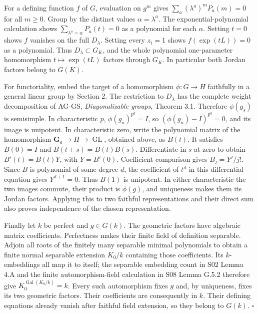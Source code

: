 \documentclass[11pt,a4paper,openany]{report}
\begin{document}
For a defining function \(f\) of \(G\), evaluation on \(g^m\) gives \(\sum_a(\lambda^a)^mP_a(m)=0\) for all \(m\geq0\). Group by the distinct values \(\alpha=\lambda^a\). The exponential-polynomial calculation shows \(\sum_{\lambda^a=\alpha}P_a(t)=0\) as a polynomial for each \(\alpha\). Setting \(t=0\) shows \(f\) vanishes on the full \(D_\lambda\). Setting every \(z_i=1\) shows \(f(\exp(tL))=0\) as a polynomial. Thus \(D_\lambda\subset G_K\), and the whole polynomial one-parameter homomorphism \(t\mapsto\exp(tL)\) factors through \(G_K\). In particular both Jordan factors belong to \(G(K)\).

For functoriality, embed the target of a homomorphism \(\phi:G\to H\) faithfully in a general linear group by Section 2. The restriction to \(D_\lambda\) has the complete weight decomposition of AG-GS, \emph{Diagonalizable groups}, Theorem 3.1. Therefore \(\phi(g_s)\) is semisimple. In characteristic \(p\), \(\phi(g_u)^{p^q}=I\), so \((\phi(g_u)-I)^{p^q}=0\), and its image is unipotent. In characteristic zero, write the polynomial matrix of the homomorphism \(\mathbf G_a\to H\to\operatorname{GL}\), obtained above, as \(B(t)\). It satisfies \(B(0)=I\) and \(B(t+s)=B(t)B(s)\). Differentiate in \(s\) at zero to obtain \(B'(t)=B(t)Y\), with \(Y=B'(0)\). Coefficient comparison gives \(B_j=Y^j/j!\). Since \(B\) is polynomial of some degree \(d\), the coefficient of \(t^d\) in this differential equation gives \(Y^{d+1}=0\). Thus \(B(1)\) is unipotent. In either characteristic the two images commute, their product is \(\phi(g)\), and uniqueness makes them its Jordan factors. Applying this to two faithful representations and their direct sum also proves independence of the chosen representation.

Finally let \(k\) be perfect and \(g\in G(k)\). The geometric factors have algebraic matrix coefficients. Perfectness makes their finite field of definition separable. Adjoin all roots of the finitely many separable minimal polynomials to obtain a finite normal separable extension \(K_0/k\) containing those coefficients. Its \(k\)-embeddings all map it to itself; the separable embedding count in S02 Lemma 4.A and the finite automorphism-field calculation in S08 Lemma G.5.2 therefore give \(K_0^{\operatorname{Gal}(K_0/k)}=k\). Every such automorphism fixes \(g\) and, by uniqueness, fixes its two geometric factors. Their coefficients are consequently in \(k\). Their defining equations already vanish after faithful field extension, so they belong to \(G(k)\). \(\square\)
\end{document}

